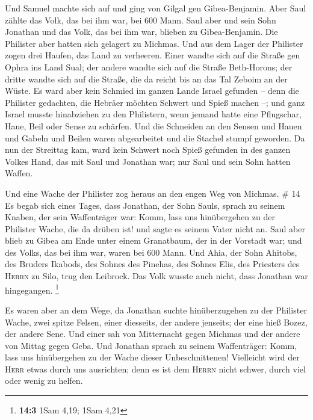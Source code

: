  Und Samuel machte sich auf und ging von Gilgal gen
Gibea-Benjamin. Aber Saul zählte das Volk, das bei ihm war, bei 600
Mann.  Saul aber und sein Sohn Jonathan und das Volk, das
bei ihm war, blieben zu Gibea-Benjamin. Die Philister aber hatten sich
gelagert zu Michmas.  Und aus dem Lager der Philister
zogen drei Haufen, das Land zu verheeren. Einer wandte sich auf die
Straße gen Ophra ins Land Sual;  der andere wandte sich
auf die Straße Beth-Horons; der dritte wandte sich auf die Straße, die
da reicht bis an das Tal Zeboim an der Wüste.  Es ward
aber kein Schmied im ganzen Lande Israel gefunden -- denn die Philister
gedachten, die Hebräer möchten Schwert und Spieß machen --;
 und ganz Israel musste hinabziehen zu den Philistern,
wenn jemand hatte eine Pflugschar, Haue, Beil oder Sense zu schärfen.
 Und die Schneiden an den Sensen und Hauen und Gabeln und
Beilen waren abgearbeitet und die Stachel stumpf geworden.
 Da nun der Streittag kam, ward kein Schwert noch Spieß
gefunden in des ganzen Volkes Hand, das mit Saul und Jonathan war; nur
Saul und sein Sohn hatten Waffen.

 Und eine Wache der Philister zog heraus an den engen Weg
von Michmas. \# 14  Es begab sich eines Tages, dass
Jonathan, der Sohn Sauls, sprach zu seinem Knaben, der sein Waffenträger
war: Komm, lass uns hinübergehen zu der Philister Wache, die da drüben
ist! und sagte es seinem Vater nicht an.  Saul aber blieb
zu Gibea am Ende unter einem Granatbaum, der in der Vorstadt war; und
des Volks, das bei ihm war, waren bei 600 Mann.  Und Ahia,
der Sohn Ahitobs, des Bruders Ikabods, des Sohnes des Pinehas, des
Sohnes Elis, des Priesters des \textsc{Herrn} zu Silo, trug den
Leibrock. Das Volk wusste auch nicht, dass Jonathan war hingegangen.
\footnote{\textbf{14:3} 1Sam 4,19; 1Sam 4,21}

 Es waren aber an dem Wege, da Jonathan suchte
hinüberzugehen zu der Philister Wache, zwei spitze Felsen, einer
diesseits, der andere jenseits; der eine hieß Bozez, der andere Sene.
 Und einer sah von Mitternacht gegen Michmas und der
andere von Mittag gegen Geba.  Und Jonathan sprach zu
seinem Waffenträger: Komm, lass uns hinübergehen zu der Wache dieser
Unbeschnittenen! Vielleicht wird der \textsc{Herr} etwas durch uns
ausrichten; denn es ist dem \textsc{Herrn} nicht schwer, durch viel oder
wenig zu helfen.

